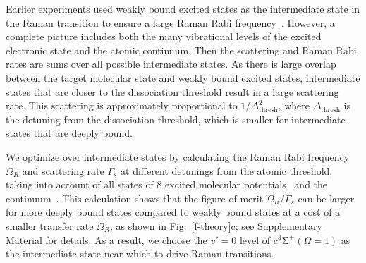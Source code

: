 \documentclass[aps,prl,twocolumn,10pt,superscriptaddress]{revtex4-1}
\begin{document}
Earlier experiments used weakly bound excited states as the intermediate state
in the Raman transition to ensure a large Raman Rabi frequency~\cite{Wynar2000,Rom2004}.
However, a complete picture includes both the many vibrational levels
of the excited electronic state and the atomic continuum.
Then the scattering and Raman Rabi rates are sums over all possible intermediate states.
As there is large overlap between the target molecular state and weakly bound excited states, intermediate states that are closer to the dissociation threshold result in a large scattering rate.
This scattering is approximately proportional to $1/\Delta_{\mathrm{thresh}}^2$,
where $\Delta_{\mathrm{thresh}}$ is the detuning from the dissociation threshold,
which is smaller for intermediate states that are deeply bound.


We optimize over intermediate states by calculating the Raman Rabi frequency $\Omega_R$
and scattering rate $\Gamma_s$ at different detunings from the atomic threshold,
taking into account of all states of
8 excited molecular potentials~\cite{Korek2007, Grochola2011, Zaharova2009, Grochola2010, Zabawa2012}
and the continuum~\cite{Liu2017}.
This calculation shows that the figure of merit $\Omega_R/\Gamma_s$
can be larger for more deeply bound states compared to weakly bound states
at a cost of a smaller transfer rate $\Omega_R$, as shown in Fig.~\ref{f-theory}c;
see Supplementary Material for details.
As a result, we choose the $v'=0$ level of $\mathrm{c^3\Sigma^+}(\Omega = 1)$
as the intermediate state near which to drive Raman transitions.
\end{document}
